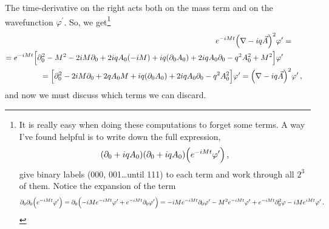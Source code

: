 \documentclass[main.tex]{subfiles}
\begin{document}
The time-derivative on the right acts both on the mass term and on the wavefunction \(\varphi^{\prime }\). So, we get\footnote{It is really easy when doing these computations to forget some terms. A way I've found helpful is to write down the full expression, 
%
\begin{align}
\qty(\partial_0 + i q A_0 )
\qty(\partial_0 + i q A_0 )
\qty(e^{-iMt} \varphi')
\,,
\end{align}
%
give binary labels (000, 001\dots until 111) to each term and work through all \(2^3\) of them. Notice the expansion of the term 
%
\begin{align}
\partial_0 \partial_0 \qty(e^{-iMt} \varphi')
= \partial_0 \qty(-iM e^{-iMt} \varphi' + e^{-iMt} \partial_0 \varphi')
= -iM e^{-iMt} \partial_0 \varphi' 
- M^2 e^{-iMt} \varphi' 
+ e^{-iMt} \partial_0^2 \varphi 
- iM e^{iMt} \varphi' 
\,.
\end{align}
}
%
\begin{subequations}
\begin{align}
\begin{split}
e^{-iMt} \qty(\nabla- iq \vec{A})^2 &\varphi^{\prime } = \\
=e^{-iMt}
\qty[\partial_0^2 - M^2 - 2iM \partial_0  + 2iq A_0 (-iM) + iq \qty(\partial_0 A_0 ) + 2iq A_0 \partial_0 - q^2 A_0^2 + M^2] & \varphi^{\prime }  
\end{split}
\\ 
= \qty[\partial_0^2 - 2iM \partial_0  + 2q A_0 M + iq \qty(\partial_0 A_0 ) + 2iq A_0 \partial_0 - q^2 A_0^2 ]
\varphi^{\prime }
=  
\qty(\nabla- iq \vec{A})^2  &\varphi^{\prime }
\,,
\end{align}
\end{subequations}
%
and now we must discuss which terms we can discard. 

\end{document}
